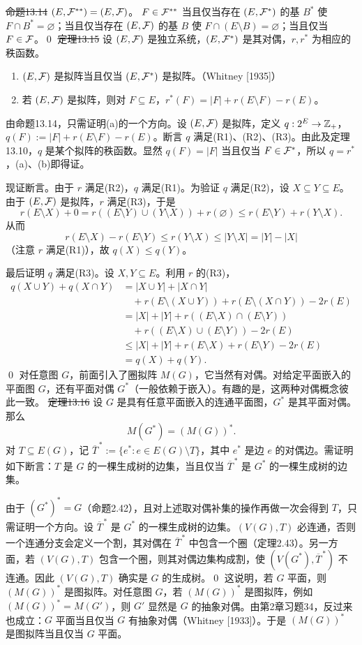 \st{命题13.14} $(E,\mathcal F^{**})=(E,\mathcal F)$。
\pr $F\in\mathcal F^{**}$ 当且仅当存在 $(E,\mathcal F^*)$ 的基 $B^*$ 使 $F\cap B^*=\varnothing$；当且仅当存在 $(E,\mathcal F)$ 的基 $B$ 使 $F\cap(E\setminus B)=\varnothing$；当且仅当 $F\in\mathcal F$。\qed
\st{定理13.15} 设 $(E,\mathcal F)$ 是独立系统，$(E,\mathcal F^*)$ 是其对偶，$r,r^*$ 为相应的秩函数。
\begin{enumerate}[label=(\alph*)]
\item $(E,\mathcal F)$ 是拟阵当且仅当 $(E,\mathcal F^*)$ 是拟阵。（Whitney [1935]）
\item 若 $(E,\mathcal F)$ 是拟阵，则对 $F\subseteq E$，$r^*(F)=|F|+r(E\setminus F)-r(E)$。
\end{enumerate}
\pr 由命题13.14，只需证明(a)的一个方向。设 $(E,\mathcal F)$ 是拟阵，定义 $q:2^E\to\mathbb Z_+$，$q(F):=|F|+r(E\setminus F)-r(E)$。断言 $q$ 满足(R1)、(R2)、(R3)。由此及定理13.10，$q$ 是某个拟阵的秩函数。显然 $q(F)=|F|$ 当且仅当 $F\in\mathcal F^*$，所以 $q=r^*$，(a)、(b)即得证。

现证断言。由于 $r$ 满足(R2)，$q$ 满足(R1)。为验证 $q$ 满足(R2)，设 $X\subseteq Y\subseteq E$。由于 $(E,\mathcal F)$ 是拟阵，$r$ 满足(R3)，于是
\[r(E\setminus X)+0=r((E\setminus Y)\cup(Y\setminus X))+r(\varnothing)
\le r(E\setminus Y)+r(Y\setminus X).\]
从而
\[r(E\setminus X)-r(E\setminus Y)\le r(Y\setminus X)\le|Y\setminus X|=|Y|-|X|\]
（注意 $r$ 满足(R1)），故 $q(X)\le q(Y)$。

最后证明 $q$ 满足(R3)。设 $X,Y\subseteq E$。利用 $r$ 的(R3)，
\begin{align*}
q(X\cup Y)+q(X\cap Y)
&=|X\cup Y|+|X\cap Y|\\
&\quad+r(E\setminus(X\cup Y))+r(E\setminus(X\cap Y))-2r(E)\\
&=|X|+|Y|+r((E\setminus X)\cap(E\setminus Y))\\
&\quad+r((E\setminus X)\cup(E\setminus Y))-2r(E)\\
&\le|X|+|Y|+r(E\setminus X)+r(E\setminus Y)-2r(E)\\
&=q(X)+q(Y).
\end{align*}\qed
对任意图 $G$，前面引入了圈拟阵 $M(G)$，它当然有对偶。对给定平面嵌入的平面图 $G$，还有平面对偶 $G^*$（一般依赖于嵌入）。有趣的是，这两种对偶概念彼此一致。
\st{定理13.16} 设 $G$ 是具有任意平面嵌入的连通平面图，$G^*$ 是其平面对偶。那么
\[M(G^*)=(M(G))^*.\]
\pr 对 $T\subseteq E(G)$，记 $\overline T^{\,*}:=\{e^*:e\in E(G)\setminus T\}$，其中 $e^*$ 是边 $e$ 的对偶边。需证明如下断言：$T$ 是 $G$ 的一棵生成树的边集，当且仅当 $\overline T^{\,*}$ 是 $G^*$ 的一棵生成树的边集。

由于 $(G^*)^*=G$（命题2.42），且对上述取对偶补集的操作再做一次会得到 $T$，只需证明一个方向。设 $\overline T^{\,*}$ 是 $G^*$ 的一棵生成树的边集。$(V(G),T)$ 必连通，否则一个连通分支会定义一个割，其对偶在 $\overline T^{\,*}$ 中包含一个圈（定理2.43）。另一方面，若 $(V(G),T)$ 包含一个圈，则其对偶边集构成割，使 $(V(G^*),\overline T^{\,*})$ 不连通。因此 $(V(G),T)$ 确实是 $G$ 的生成树。\qed
这说明，若 $G$ 平面，则 $(M(G))^*$ 是图拟阵。对任意图 $G$，若 $(M(G))^*$ 是图拟阵，例如 $(M(G))^*=M(G')$，则 $G'$ 显然是 $G$ 的抽象对偶。由第2章习题34，反过来也成立：$G$ 平面当且仅当 $G$ 有抽象对偶（Whitney [1933]）。于是 $(M(G))^*$ 是图拟阵当且仅当 $G$ 平面。

